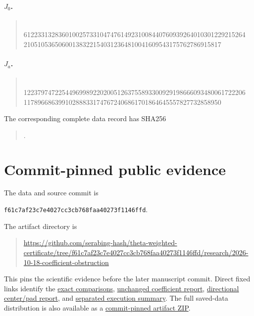 \documentclass[11pt,a4paper]{article}
\newcommand{\ArtifactCommit}{f61c7af23c7e4027cc3cb768faa40273f1146ffd}
\newcommand{\ArtifactURL}{https://github.com/serabing-hash/theta-weighted-certificate/tree/\ArtifactCommit/research/2026-10-18-coefficient-obstruction}
\theoremstyle{definition}
\theoremstyle{remark}
\numberwithin{equation}{section}
\begin{document}
\paragraph{$J_0$.}
\begin{quote}\small{}\\
6122331328360100257331047476149231008440760939264010301229215264\\
210510536506001383221540312364810041609543175762786915817
\end{quote}
\paragraph{$J_a$.}
\begin{quote}\small{}\\
1223797472254496998922020051263755893300929198666093480061722206\\
117896686399102888331747672406861701864645557827732858950
\end{quote}

The corresponding complete data record has SHA256
\begin{quote}\small{}.\end{quote}

\section{Commit-pinned public evidence}\label{app:artifacts}

The data and source commit \cite{data} is
\begin{center}\small\texttt{\ArtifactCommit}.\end{center}
The artifact directory is
\begin{quote}\small
\edef\PinnedArtifactURL{\ArtifactURL}\expandafter\url\expandafter{\PinnedArtifactURL}
\end{quote}
This pins the scientific evidence before the later manuscript commit.
Direct fixed links identify the
\href{https://github.com/serabing-hash/theta-weighted-certificate/blob/\ArtifactCommit/research/2026-10-18-coefficient-obstruction/results/exact_comparisons.json}{exact comparisons},
\href{https://github.com/serabing-hash/theta-weighted-certificate/blob/\ArtifactCommit/research/2026-10-18-coefficient-obstruction/results/coefficient_check.json}{unchanged coefficient report},
\href{https://github.com/serabing-hash/theta-weighted-certificate/blob/\ArtifactCommit/research/2026-10-18-coefficient-obstruction/inputs/witness_check.json}{directional center/pad report}, and
\href{https://github.com/serabing-hash/theta-weighted-certificate/blob/\ArtifactCommit/research/2026-10-18-coefficient-obstruction/results/execution_summary.json}{separated execution summary}.
The full saved-data distribution is also available as a
\href{https://github.com/serabing-hash/theta-weighted-certificate/raw/\ArtifactCommit/downloads/THETA_COEFFICIENT_OBSTRUCTION_ARTIFACTS_20261018.zip}{commit-pinned artifact ZIP}.
\end{document}
